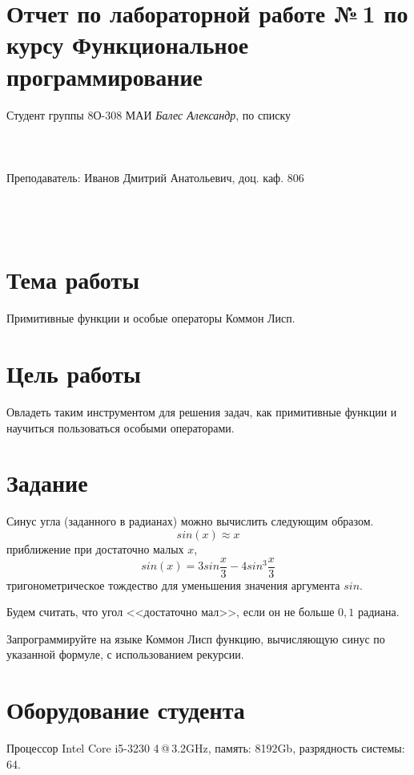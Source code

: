 \documentclass[12pt]{article}
\begin{document}
\section*{Отчет по лабораторной работе №\,1 
по курсу \guillemotleft  Функциональное программирование\guillemotright}
\begin{flushright}
Студент группы 8О-308 МАИ \textit{Балес Александр},  по списку \\
 \\
 \\
\ \\
Преподаватель: Иванов Дмитрий Анатольевич, доц. каф. 806 \\
 \\
 \\
 \\

\end{flushright}

\section{Тема работы}
Примитивные функции и особые операторы Коммон Лисп.

\section{Цель работы}
Овладеть таким инструментом для решения задач, как примитивные функции и научиться пользоваться особыми операторами.

\section{Задание}
Синус угла (заданного в радианах) можно вычислить следующим образом.
$$sin(x)\approx x$$ приближение при достаточно малых $x$, $$sin(x) = 3sin\dfrac{x}{3} - 4sin^3\dfrac{x}{3}$$ тригонометрическое тождество для уменьшения значения аргумента $sin$.

Будем считать, что угол <<достаточно мал>>, если он не больше $0,1$ радиана.

Запрограммируйте на языке Коммон Лисп функцию, вычисляющую синус по указанной формуле, с использованием рекурсии.
\section{Оборудование студента}
Процессор Intel Core i5-3230 4\,@\,3.2GHz, память: 8192Gb, разрядность системы: 64.
\end{document}

